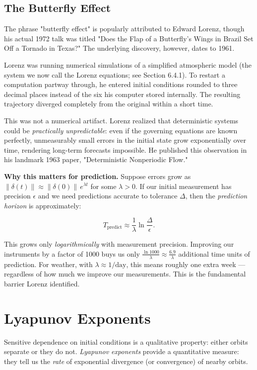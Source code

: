 \subsection{The Butterfly Effect}\label{sec:6.2.2}

The phrase "butterfly effect" is popularly attributed to Edward Lorenz, though his actual 1972 talk was titled "Does the Flap of a Butterfly's Wings in Brazil Set Off a Tornado in Texas?" The underlying discovery, however, dates to 1961.

Lorenz was running numerical simulations of a simplified atmospheric model (the system we now call the Lorenz equations; see Section 6.4.1). To restart a computation partway through, he entered initial conditions rounded to three decimal places instead of the six his computer stored internally. The resulting trajectory diverged completely from the original within a short time.

This was not a numerical artifact. Lorenz realized that deterministic systems could be \textit{practically unpredictable}: even if the governing equations are known perfectly, unmeasurably small errors in the initial state grow exponentially over time, rendering long-term forecasts impossible. He published this observation in his landmark 1963 paper, "Deterministic Nonperiodic Flow."

\textbf{Why this matters for prediction.} Suppose errors grow as $\|\delta(t)\| \approx \|\delta(0)\| \, e^{\lambda t}$ for some $\lambda > 0$. If our initial measurement has precision $\epsilon$ and we need predictions accurate to tolerance $\Delta$, then the \textit{prediction horizon} is approximately:

\[
T_{\text{predict}} \approx \frac{1}{\lambda} \ln \frac{\Delta}{\epsilon}.
\]

This grows only \textit{logarithmically} with measurement precision. Improving our instruments by a factor of 1000 buys us only $\frac{\ln 1000}{\lambda} \approx \frac{6.9}{\lambda}$ additional time units of prediction. For weather, with $\lambda \approx 1/\text{day}$, this means roughly one extra week --- regardless of how much we improve our measurements. This is the fundamental barrier Lorenz identified.


\bigskip


\section{Lyapunov Exponents}\label{sec:6.3}

Sensitive dependence on initial conditions is a qualitative property: either orbits separate or they do not. \textit{Lyapunov exponents} provide a quantitative measure: they tell us the \textit{rate} of exponential divergence (or convergence) of nearby orbits.

